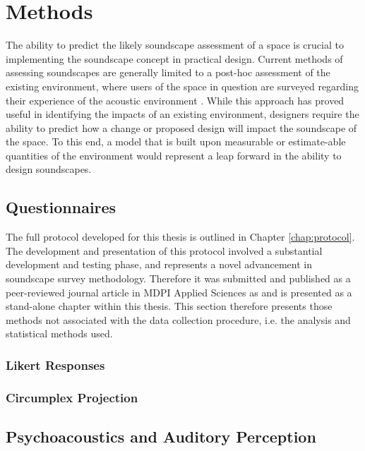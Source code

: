 \chapter{Methods}
\label{chap:methods}

The ability to predict the likely soundscape assessment of a space is crucial to implementing the soundscape concept in practical design. Current methods of assessing soundscapes are generally limited to a post-hoc assessment of the existing environment, where users of the space in question are surveyed regarding their experience of the acoustic environment \citep{Engel2018Review, Zhang2018Effect}. While this approach has proved useful in identifying the impacts of an existing environment, designers require the ability to predict how a change or proposed design will impact the soundscape of the space. To this end, a model that is built upon measurable or estimate-able quantities of the environment would represent a leap forward in the ability to design soundscapes.

\section{Questionnaires}

 The full protocol developed for this thesis is outlined in Chapter \ref{chap:protocol}. The development and presentation of this protocol involved a substantial development and testing phase, and represents a novel advancement in soundscape survey methodology. Therefore it was submitted and published as a peer-reviewed journal article in MDPI Applied Sciences as \citet{Mitchell2020Soundscape} and is presented as a stand-alone chapter within this thesis. This section therefore presents those methods not associated with the data collection procedure, i.e. the analysis and statistical methods used.

 \subsection{Likert Responses}

 \subsection{Circumplex Projection}

\section{Psychoacoustics and Auditory Perception}

